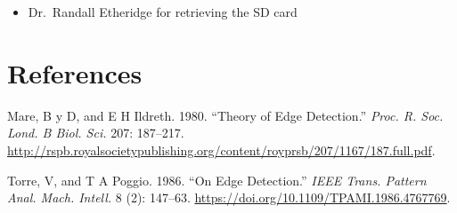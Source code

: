 \documentclass[]{article}
\providecommand{\tightlist}{%
  \setlength{\itemsep}{0pt}\setlength{\parskip}{0pt}}
\begin{document}
\begin{itemize}
\tightlist
\item
  Dr.~Randall Etheridge for retrieving the SD card
\end{itemize}

\hypertarget{references}{%
\section*{References}\label{references}}

\hypertarget{refs}{}
\leavevmode\hypertarget{ref-Mare1980-kl}{}%
Mare, B y D, and E H Ildreth. 1980. ``Theory of Edge Detection.'' \emph{Proc. R. Soc. Lond. B Biol. Sci.} 207: 187--217. \url{http://rspb.royalsocietypublishing.org/content/royprsb/207/1167/187.full.pdf}.

\leavevmode\hypertarget{ref-Torre1986-ez}{}%
Torre, V, and T A Poggio. 1986. ``On Edge Detection.'' \emph{IEEE Trans. Pattern Anal. Mach. Intell.} 8 (2): 147--63. \url{https://doi.org/10.1109/TPAMI.1986.4767769}.
\end{document}

